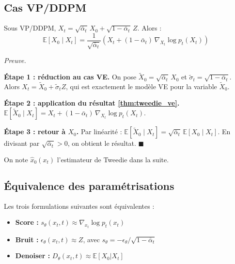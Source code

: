 \documentclass[12pt]{article}
\renewcommand{\qedsymbol}{$\blacksquare$}
\renewenvironment{proof}[1][\proofname]{%
  \par\medskip\noindent
  \textit{\color{proofgray}#1.}\enspace\ignorespaces
}{\hfill\qedsymbol\par\medskip}
\renewcommand{\proofname}{Preuve}
\begin{document}
\subsection{Cas VP/DDPM}

\begin{resultbox}
\label{thm:tweedie_vp}
Sous VP/DDPM, $X_t = \sqrt{\bar\alpha_t}\, X_0 + \sqrt{1-\bar\alpha_t}\, Z$. Alors :
\begin{equation}
    \boxed{\mathbb{E}[X_0 \mid X_t] = \frac{1}{\sqrt{\bar\alpha_t}}\!\left(X_t + (1-\bar\alpha_t)\, \nabla_{X_t} \log p_t(X_t)\right)}
    \label{eq:tweedie_vp}
\end{equation}
\end{resultbox}

  \begin{proof}

\textbf{Étape 1 : réduction au cas VE.} On pose $\tilde{X}_0 = \sqrt{\bar\alpha_t}\, X_0$ et $\tilde\sigma_t = \sqrt{1-\bar\alpha_t}$. Alors $X_t = \tilde{X}_0 + \tilde\sigma_t Z$, qui est exactement le modèle VE pour la variable $\tilde{X}_0$.

\textbf{Étape 2 : application du résultat \ref{thm:tweedie_ve}.}
$\mathbb{E}[\tilde{X}_0 \mid X_t] = X_t + (1-\bar\alpha_t)\, \nabla_{X_t} \log p_t(X_t)$.

\textbf{Étape 3 : retour à $X_0$.} Par linéarité : $\mathbb{E}[\tilde{X}_0 \mid X_t] = \sqrt{\bar\alpha_t}\, \mathbb{E}[X_0 \mid X_t]$. En divisant par $\sqrt{\bar\alpha_t} > 0$, on obtient le résultat.
\end{proof}

On note $\hat{x}_0(x_t)$ l'estimateur de Tweedie dans la suite.


\subsection{Équivalence des paramétrisations}

\begin{resultbox}
\label{res:equiv}
Les trois formulations suivantes sont équivalentes :
\begin{itemize}
    \item \textbf{Score :} $s_\theta(x_t, t) \approx \nabla_{x_t} \log p_t(x_t)$
    \item \textbf{Bruit :} $\epsilon_\theta(x_t, t) \approx Z$, avec $s_\theta = -\epsilon_\theta / \sqrt{1-\bar\alpha_t}$
    \item \textbf{Denoiser :} $D_\theta(x_t, t) \approx \mathbb{E}[X_0 | X_t]$
\end{itemize}
\end{resultbox}
\end{document}
